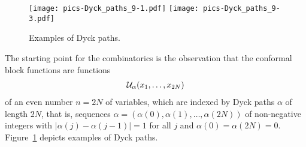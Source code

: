 \documentclass[oneside,english]{amsart}
\numberwithin{equation}{section}
\numberwithin{figure}{section}
\theoremstyle{plain}
\theoremstyle{plain}
\theoremstyle{plain}
\theoremstyle{remark}
\theoremstyle{plain}
\theoremstyle{plain}
\theoremstyle{plain}
\theoremstyle{plain}
\theoremstyle{plain}
\theoremstyle{plain}
\theoremstyle{plain}
\theoremstyle{plain}
\newcommand{\blue}[1]{{\color{blue} #1}}
\begin{document}
\begin{figure}
\centerfloat
\texttt{[image: pics-Dyck\_paths\_9-1.pdf]} \qquad
\texttt{[image: pics-Dyck\_paths\_9-3.pdf]} \\
\caption{\label{fig: Dyck paths}
Examples of Dyck paths.
}
\end{figure}
The starting point for the combinatorics
is the observation that the conformal block functions are functions
\begin{align*}
\mathcal{U}_\alpha (x_1 , \ldots , x_{2N})
\end{align*}
of an even number $n = 2N$ of variables, which are
indexed by Dyck paths $\alpha$ of length $2N$, that is,
sequences $\alpha = (\alpha(0) , \alpha(1) , \ldots , \alpha(2N))$ of non-negative integers
with $|\alpha(j) - \alpha(j-1)| = 1$ for all $j$ and $\alpha(0) = \alpha(2N) = 0$.
Figure~\ref{fig: Dyck paths} depicts examples of Dyck paths.

\end{document}

